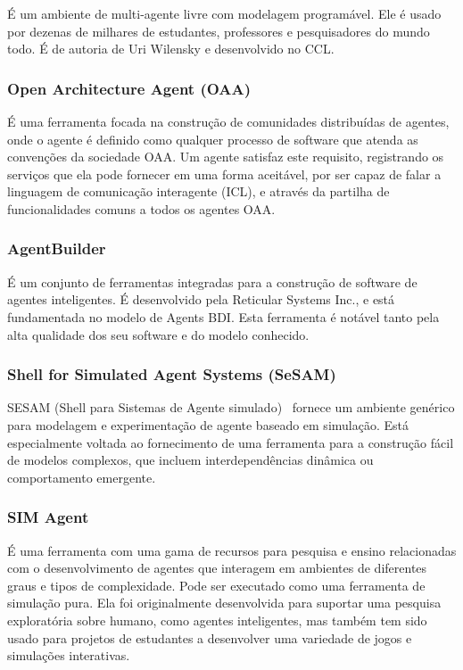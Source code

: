 É um ambiente de multi-agente livre com modelagem programável. Ele é usado por dezenas de milhares de estudantes, professores e pesquisadores do mundo todo. É de autoria de Uri Wilensky e desenvolvido no CCL.  


\subsubsection*{Open Architecture Agent (OAA)}

É uma ferramenta focada na construção de comunidades distribuídas de agentes, onde o agente é definido como qualquer processo de software que atenda as convenções da sociedade OAA. Um agente satisfaz este requisito, registrando os serviços que ela pode fornecer em uma forma aceitável, por ser capaz de falar a linguagem de comunicação interagente (ICL), e através da partilha de funcionalidades comuns a todos os agentes OAA. 

\subsubsection*{AgentBuilder}

É um conjunto de ferramentas integradas para a construção de software de agentes inteligentes. É desenvolvido pela Reticular Systems Inc., e está fundamentada no modelo de Agents BDI. Esta ferramenta é notável tanto pela alta qualidade dos seu software e do modelo conhecido.


\subsubsection*{Shell for Simulated Agent Systems (SeSAM)} 

SESAM (Shell para Sistemas de Agente simulado)~\citep{Sesam:2011} fornece um ambiente genérico para modelagem e experimentação de agente baseado em simulação. Está especialmente voltada ao fornecimento de uma ferramenta para a construção fácil de modelos complexos, que incluem interdependências dinâmica ou comportamento emergente. 

\subsubsection*{SIM Agent}

É uma ferramenta com uma gama de recursos para pesquisa e ensino relacionadas com o desenvolvimento de agentes que interagem em ambientes de diferentes graus e tipos de complexidade. Pode ser executado como uma ferramenta de simulação pura. Ela foi originalmente desenvolvida para suportar uma pesquisa exploratória sobre humano, como agentes inteligentes, mas também tem sido usado para projetos de estudantes a desenvolver uma variedade de jogos e simulações interativas.

